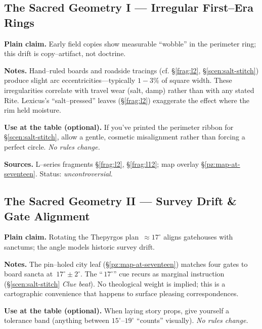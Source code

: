 \documentclass[11pt]{article}
\begin{document}
\begin{itemize}
\subsection{The Sacred Geometry I — Irregular First–Era Rings}
\label{konmetry:irregular-rings}
{}

\noindent\textbf{Plain claim.} Early field copies show measurable “wobble” in the perimeter ring; this drift is copy–artifact, not doctrine.

\medskip
\noindent\textbf{Notes.} Hand–ruled boards and roadside tracings (cf. \S\ref{frag:l2}, \S\ref{scen:salt-stitch}) produce slight arc eccentricities—typically \(1\!-\!3\%\) of square width. These irregularities correlate with travel wear (salt, damp) rather than with any stated Rite. Lexicus’s “salt–pressed” leaves (\S\ref{frag:l2}) exaggerate the effect where the rim held moisture.

\medskip
\noindent\textbf{Use at the table (optional).} If you’ve printed the perimeter ribbon for \S\ref{scen:salt-stitch}, allow a gentle, cosmetic misalignment rather than forcing a perfect circle. \emph{No rules change.}

\medskip
\noindent\textbf{Sources.} L–series fragments \S\ref{frag:l2}, \S\ref{frag:l12}; map overlay \S\ref{pz:map-at-seventeen}. Status: \emph{uncontroversial}.

  \subsection{The Sacred Geometry II — Survey Drift \& Gate Alignment}
\label{konmetry:seventeen}
{}

\noindent\textbf{Plain claim.} Rotating the Thepyrgos plan \(\,\approx17^\circ\) aligns gatehouses with sanctums; the angle models historic survey drift.

\medskip
\noindent\textbf{Notes.} The pin–holed city leaf (\S\ref{pz:map-at-seventeen}) matches four gates to board sancta at \(\,17^\circ\pm2^\circ\). The “\(\,17^\circ\)” cue recurs as marginal instruction (\S\ref{scen:salt-stitch} \emph{Clue beat}). No theological weight is implied; this is a cartographic convenience that happens to surface pleasing correspondences.

\medskip
\noindent\textbf{Use at the table (optional).} When laying story props, give yourself a tolerance band (anything between \(15^\circ\)–\(19^\circ\) “counts” visually). \emph{No rules change.}


\end{itemize}
\end{document}
